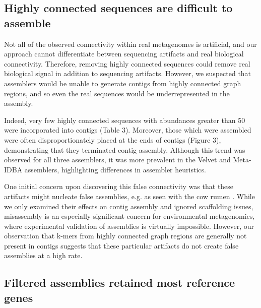 \documentclass[10pt]{article}
\begin{document}
\subsection*{Highly connected sequences are difficult to assemble}

Not all of the observed connectivity within real metagenomes is
artificial, and our approach cannot differentiate between sequencing
artifacts and real biological connectivity.  Therefore, removing
highly connected sequences could remove real biological signal in
addition to sequencing artifacts.  However, we suspected that
assemblers would be unable to generate contigs from highly connected
graph regions, and so even the real sequences would be
underrepresented in the assembly.

Indeed, very few highly connected sequences with abundances greater
than 50 were incorporated into contigs (Table 3). Moreover, those
which were assembled were often disproportionately placed at the ends
of contigs (Figure 3), demonstrating that they terminated contig
assembly.  Although this trend was observed for all three assemblers,
it was more prevalent in the Velvet and Meta-IDBA assemblers,
highlighting differences in assembler heuristics.

One initial concern upon discovering this false connectivity was that
these artifacts might nucleate false assemblies, e.g. as seen with the cow
rumen \cite{Hess:2011p686}.  While we only examined their effects on
contig assembly and ignored scaffolding issues, misassembly is an
especially significant concern for environmental metagenomics, where
experimental validation of assemblies is virtually impossible.
However, our observation that k-mers from highly connected graph
regions are generally not present in contigs suggests that these
particular artifacts do not create false assemblies at a high rate.

\subsection*{Filtered assemblies retained most reference genes}
\end{document}
